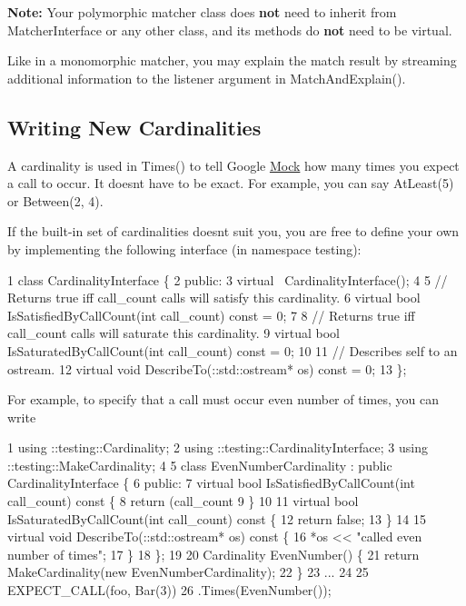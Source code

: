 {\bfseries Note\+:} Your polymorphic matcher class does {\bfseries not} need to inherit from {\ttfamily Matcher\+Interface} or any other class, and its methods do {\bfseries not} need to be virtual.

Like in a monomorphic matcher, you may explain the match result by streaming additional information to the {\ttfamily listener} argument in {\ttfamily Match\+And\+Explain()}.

\subsection*{Writing New Cardinalities}

A cardinality is used in {\ttfamily Times()} to tell Google \hyperlink{classMock}{Mock} how many times you expect a call to occur. It doesn\textquotesingle{}t have to be exact. For example, you can say {\ttfamily At\+Least(5)} or {\ttfamily Between(2, 4)}.

If the built-\/in set of cardinalities doesn\textquotesingle{}t suit you, you are free to define your own by implementing the following interface (in namespace {\ttfamily testing})\+:


\begin{DoxyCode}
1 class CardinalityInterface \{
2  public:
3   virtual ~CardinalityInterface();
4 
5   // Returns true iff call\_count calls will satisfy this cardinality.
6   virtual bool IsSatisfiedByCallCount(int call\_count) const = 0;
7 
8   // Returns true iff call\_count calls will saturate this cardinality.
9   virtual bool IsSaturatedByCallCount(int call\_count) const = 0;
10 
11   // Describes self to an ostream.
12   virtual void DescribeTo(::std::ostream* os) const = 0;
13 \};
\end{DoxyCode}


For example, to specify that a call must occur even number of times, you can write


\begin{DoxyCode}
1 using ::testing::Cardinality;
2 using ::testing::CardinalityInterface;
3 using ::testing::MakeCardinality;
4 
5 class EvenNumberCardinality : public CardinalityInterface \{
6  public:
7   virtual bool IsSatisfiedByCallCount(int call\_count) const \{
8     return (call\_count %
9   \}
10 
11   virtual bool IsSaturatedByCallCount(int call\_count) const \{
12     return false;
13   \}
14 
15   virtual void DescribeTo(::std::ostream* os) const \{
16     *os << "called even number of times";
17   \}
18 \};
19 
20 Cardinality EvenNumber() \{
21   return MakeCardinality(new EvenNumberCardinality);
22 \}
23 ...
24 
25   EXPECT\_CALL(foo, Bar(3))
26       .Times(EvenNumber());
\end{DoxyCode}


